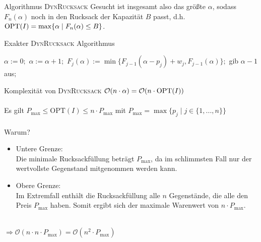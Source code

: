 \begin{frame}{Algorithmus \textsc{DynRucksack}}
    Gesucht ist insgesamt also das größte $\alpha$, sodass $F_n(\alpha)$ noch in den Rucksack der Kapazität $B$
    passt, d.h. $\operatorname{OPT}(I)=\max\{ \alpha \mid F_n(\alpha) \leq B \}$.
    
\begin{algorithm}[H]
    \caption{Exakter \textsc{DynRucksack} Algorithmus}
        \begin{algorithmic}
            \State $\alpha:=0;$
            \Repeat
            \State $\alpha:=\alpha+1;$
            \State $F_j(\alpha):=\min\{F_{j-1}(\alpha-p_j)+w_j,F_{j-1}(\alpha)\};$
            \EndFor
            \State gib $\alpha-1$ aus$;$
        \end{algorithmic}
\end{algorithm}



\end{frame}
\begin{frame}{Komplexität von \textsc{DynRucksack}}
    $\mathcal{O}( n \cdot \alpha) = \mathcal{O}( n \cdot \operatorname{OPT}(I))$ \\~\\
    \pause    
    Es gilt $P_{\text{max}} \leq \text{OPT}(I) \leq n \cdot P_{\text{max}}$ 
    \quad mit $P_{\text{max}}=\max\{p_j \mid j \in \{1,...,n\}\}$ \\~\\
    \pause
    Warum?
    \begin{itemize}
        \item Untere Grenze: \\ Die minimale Rucksackfüllung beträgt $P_{\text{max}}$, da im schlimmsten Fall nur der wertvollste Gegenstand mitgenommen werden kann.
        \item Obere Grenze:  \\ Im Extremfall enthält die Rucksackfüllung alle $n$ Gegenstände, die alle den Preis $P_{\text{max}}$ haben. Somit ergibt sich der maximale Warenwert von $n \cdot P_{\text{max}}$.
    \end{itemize} ~\\
    
    $\Rightarrow \mathcal{O}( n \cdot n \cdot P_{\max}) = \mathcal{O}( n^2 \cdot P_{\max})$    
\end{frame}
